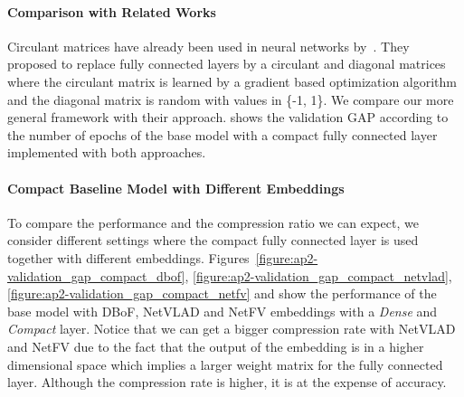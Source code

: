 \paragraph{Comparison with Related Works}

Circulant matrices have already been used in neural networks by~\citet{cheng2015exploration}.
They proposed to replace fully connected layers by a circulant and diagonal matrices where the circulant matrix is learned by a gradient based optimization algorithm and the diagonal matrix is random with values in \{-1, 1\}.
We compare our more general framework with their approach.
 shows the validation GAP according to the number of epochs of the base model with a compact fully connected layer implemented with both approaches.

%   



\paragraph{Compact Baseline Model with Different Embeddings}

To compare the performance and the compression ratio we can expect, we consider different settings where the compact fully connected layer is used together with different embeddings.
Figures~\ref{figure:ap2-validation_gap_compact_dbof}, \ref{figure:ap2-validation_gap_compact_netvlad}, 
\ref{figure:ap2-validation_gap_compact_netfv} and  
show the performance of the base model with DBoF, NetVLAD and NetFV embeddings with a \emph{Dense} and \emph{Compact} layer.
Notice that we can get a bigger compression rate with NetVLAD and NetFV due to the fact that the output of the embedding is in a higher dimensional space which implies a larger weight matrix for the fully connected layer.
Although the compression rate is higher, it is at the expense of accuracy.



